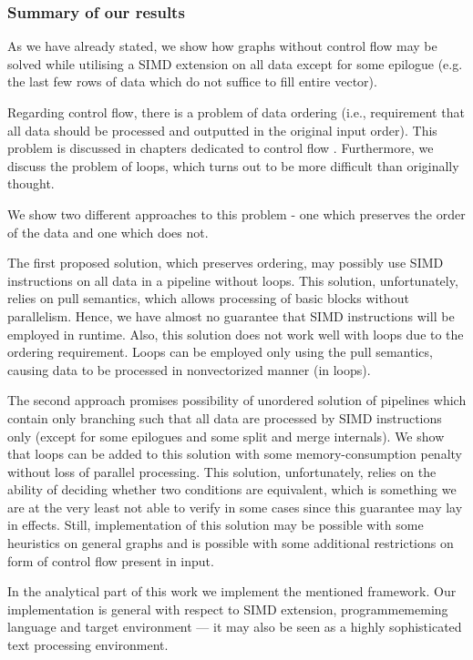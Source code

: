 \subsubsection{Summary of our results}

  As we have already stated, we show how graphs without control flow may be solved while utilising a SIMD extension on all data except for some epilogue (e.g. the last few rows of data which do not suffice to fill entire vector). 


  Regarding control flow, there is a problem of data ordering (i.e., requirement that all data should be processed and outputted in the original input order). This problem is discussed in chapters dedicated to control flow .  Furthermore, we discuss the problem of loops, which turns out to be more difficult than originally thought.  


We show two different approaches to this problem - one which preserves the order of the data and one which does not. 


  The first proposed solution, which preserves ordering, may possibly use SIMD instructions on all data in a pipeline without loops. This solution, unfortunately, relies on pull semantics, which allows processing of basic blocks without parallelism. Hence, we have almost no guarantee that SIMD instructions will be employed in runtime. Also, this solution does not work well with loops due to the ordering requirement. Loops can be employed only using the pull semantics, causing data to be processed in nonvectorized manner (in loops).


The second approach promises possibility of unordered solution of pipelines which contain only branching such that all data are processed by SIMD instructions only (except for some epilogues and some split and merge internals). We show that loops can be added to this solution with some memory-consumption penalty without loss of parallel processing. This solution, unfortunately, relies on the ability of deciding whether two conditions are equivalent, which is something we are at the very least not able to verify in some cases since this guarantee may lay in effects. Still, implementation of this solution may be possible with some heuristics on general graphs and is possible with some additional restrictions on form of control flow present in input.


  In the analytical part of this work we implement the mentioned framework. Our implementation is general with respect to SIMD extension, programmememing language and target environment --- it may also be seen as a highly sophisticated text processing environment.



